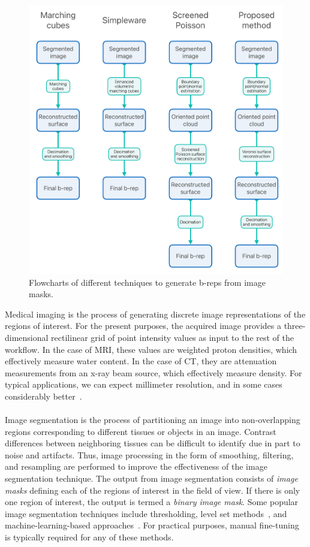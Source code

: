 \begin{figure}[t]
	\centering
		\includegraphics[scale=0.3]{media/flowchartNew.pdf}
	\caption{Flowcharts of different techniques to generate b-reps from image masks.}
	\label{fig:flowchart}
\end{figure}\noindent

%
Medical imaging is the process of generating discrete image representations of the regions of interest. For the present purposes, the acquired image provides a three-dimensional rectilinear grid of point intensity values as input to the rest of the workflow. In the case of MRI, these values are weighted proton densities, which effectively measure water content. In the case of CT, they are attenuation measurements from an x-ray beam source, which effectively measure density. For typical applications, we can expect millimeter resolution, and in some cases considerably better~\cite{van2012super}.\\ \\
%
Image segmentation is the process of partitioning an image into non-overlapping regions corresponding to different tissues or objects in an image. Contrast differences between neighboring tissues can be difficult to identify due in part to noise and artifacts. Thus, image processing in the form of smoothing, filtering, and resampling are performed to improve the effectiveness of the image segmentation technique. The output from image segmentation consists of \textit{image masks} defining each of the regions of interest in the field of view. If there is only one region of interest, the output is termed a \textit{binary image mask}. Some popular image segmentation techniques include thresholding, level set methods~\cite{malladi_1995, sethian_1996}, and machine-learning-based approaches~\cite{litjens_2017}.  For practical purposes, manual fine-tuning is typically required for any of these methods.\\ \\



